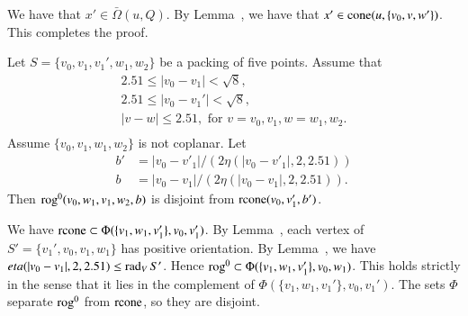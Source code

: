 \begin{tarskidata}
\begin{tarski}
\begin{proved}
We have that $x'\in\bar\Omega(u,Q)$.  By Lemma~,
we have that $x'\in{\operatorname{cone}}(u,\{v_0,v,w'\})$.  This completes
the proof.
\swallowed\end{proved}
\end{tarski}






\begin{tarski}

\begin{lemma}
Let $S=\{v_0,v_1,v_1',w_1,w_2\}$ be a packing of five points.
  Assume that
  $$\begin{array}{lll}
  2.51 \le |v_0-v_1| < \sqrt8,\\
  2.51\le |v_0-v_1'| < \sqrt8,\\
  |v-w|\le 2.51, \text{ for } v=v_0,v_1, w=w_1,w_2.\\
  \end{array}
  $$
Assume $\{v_0,v_1,w_1,w_2\}$ is not coplanar.  
Let $$
   \begin{array}{lll}
   b' &= |v_0-v'_1|/(2\eta(|v_0-v'_1|,2,2.51))\\
   b &= |v_0-v_1|/(2\eta(|v_0-v_1|,2,2.51)).
   \end{array}
   $$  
Then
${\operatorname{rog}}^0(v_0,w_1,v_1,w_2,b)$ is disjoint from ${\operatorname{rcone}}(v_0,v_1',b')$.
\end{lemma}


\begin{proved} 
We have ${\operatorname{rcone}}\subset \Phi(\{v_1,w_1,v_1'\},v_0,v_1')$.
By Lemma~, each vertex of $S'=\{v_1',v_0,v_1,w_1\}$ has positive orientation.
By Lemma~,  we have $eta(|v_0-v_1|,2,2.51) \le \operatorname{rad}_V S'$.  Hence ${\operatorname{rog}}^0\subset \Phi(\{v_1,w_1,v_1'\},v_0,w_1)$.
This holds strictly in the sense that it lies in the complement of $\Phi(\{v_1,w_1,v_1'\},v_0,v_1')$.  
The sets $\Phi$ separate
${\operatorname{rog}}^0$ from ${\operatorname{rcone}}$, so they are disjoint.
\swallowed\end{proved}
\end{tarski}







\end{tarskidata}
